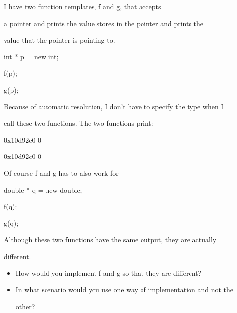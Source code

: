 I have two function templates, f and g, that accepts

a pointer and prints the value stores in the pointer and prints the

value that the pointer is pointing to.



\begin{consolethree}[escapeinside=||]

int * p = new int;

f(p);

g(p);

\end{consolethree}



Because of automatic resolution, I don't have to specify the type when I

call these two functions. The two functions print:



\begin{consolethree}[escapeinside=||]

0x10d92c0 0

0x10d92c0 0

\end{consolethree}



Of course f and g has to also work for



\begin{consolethree}[escapeinside=||]

double * q = new double;

f(q);

g(q);

\end{consolethree}



Although these two functions have the same output, they are actually

different.



\begin{itemize}

\item How would you implement f and g so that they are different?

\item In what scenario would you use one way of implementation and not the

  other?

\end{itemize}

